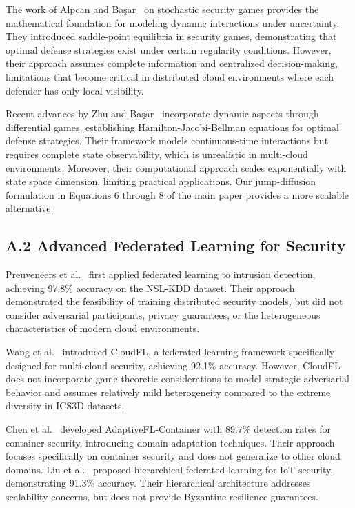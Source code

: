 \documentclass[12pt,a4paper]{article}
\theoremstyle{definition}
\begin{document}
The work of Alpcan and Başar~\cite{alpcan2011network} on stochastic security games provides the mathematical foundation for modeling dynamic interactions under uncertainty. They introduced saddle-point equilibria in security games, demonstrating that optimal defense strategies exist under certain regularity conditions. However, their approach assumes complete information and centralized decision-making, limitations that become critical in distributed cloud environments where each defender has only local visibility.

Recent advances by Zhu and Başar~\cite{zhu2015game} incorporate dynamic aspects through differential games, establishing Hamilton-Jacobi-Bellman equations for optimal defense strategies. Their framework models continuous-time interactions but requires complete state observability, which is unrealistic in multi-cloud environments. Moreover, their computational approach scales exponentially with state space dimension, limiting practical applications. Our jump-diffusion formulation in Equations 6 through 8 of the main paper provides a more scalable alternative.

\subsection{A.2 Advanced Federated Learning for Security}

Preuveneers et al.~\cite{preuveneers2018federated} first applied federated learning to intrusion detection, achieving 97.8\% accuracy on the NSL-KDD dataset. Their approach demonstrated the feasibility of training distributed security models, but did not consider adversarial participants, privacy guarantees, or the heterogeneous characteristics of modern cloud environments.

Wang et al.~\cite{wang2024cloudfl} introduced CloudFL, a federated learning framework specifically designed for multi-cloud security, achieving 92.1\% accuracy. However, CloudFL does not incorporate game-theoretic considerations to model strategic adversarial behavior and assumes relatively mild heterogeneity compared to the extreme diversity in ICS3D datasets.

Chen et al.~\cite{chen2024adaptive} developed AdaptiveFL-Container with 89.7\% detection rates for container security, introducing domain adaptation techniques. Their approach focuses specifically on container security and does not generalize to other cloud domains. Liu et al.~\cite{liu2024hierarchical} proposed hierarchical federated learning for IoT security, demonstrating 91.3\% accuracy. Their hierarchical architecture addresses scalability concerns, but does not provide Byzantine resilience guarantees.
\end{document}
